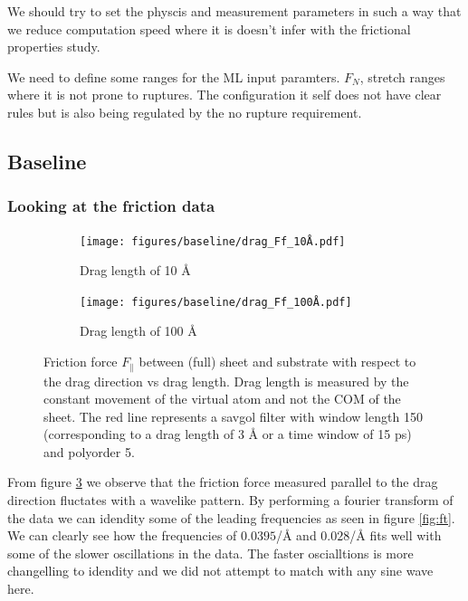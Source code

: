 We should try to set the physcis and measurement parameters in such a way that we reduce computation speed where it is doesn't infer with the frictional properties study.

We need to define some ranges for the ML input paramters. $F_N$, stretch ranges where it is not prone to ruptures. The configuration it self does not have clear rules but is also being regulated by the no rupture requirement. 

\newpage
\subsection{Baseline}

\subsubsection{Looking at the friction data}

\begin{figure}[H]
  \centering
  \begin{subfigure}[b]{0.49\textwidth}
      \centering
      \texttt{[image: figures/baseline/drag\_Ff\_10Å.pdf]}
      \caption{Drag length of 10 Å}
      \label{fig:drag_Ff_10}
  \end{subfigure}
  \hfill
  \begin{subfigure}[b]{0.49\textwidth}
      \centering
      \texttt{[image: figures/baseline/drag\_Ff\_100Å.pdf]}
      \caption{Drag length of 100 Å}
      \label{fig:drag_Ff_100}
  \end{subfigure}
  \hfill
     \caption{Friction force $F_\parallel$ between (full) sheet and substrate with respect to the drag direction vs drag length. Drag length is measured by the constant movement of the virtual atom and not the COM of the sheet. The red line represents a savgol filter with window length 150 (corresponding to a drag length of 3 Å or a time window of 15 ps) and polyorder 5. }
     \label{fig:drag_Ff}
\end{figure}

From figure \ref{fig:drag_Ff} we observe that the friction force measured parallel to the drag direction fluctates with a wavelike pattern. By performing a fourier transform of the data we can idendity some of the leading frequencies as seen in figure \ref{fig:ft}. We can clearly see how the frequencies of $0.0395$/Å and $0.028$/Å fits well with some of the slower oscillations in the data. The faster oscialltions is more changelling to idendity and we did not attempt to match with any sine wave here. 


